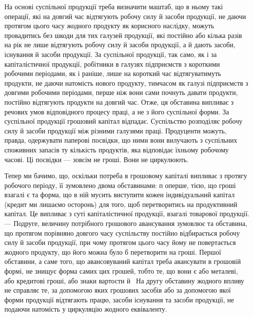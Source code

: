 
На основі суспільної продукції треба визначити маштаб, що в ньому
такі операції, які на довгий час відтягують робочу силу й засоби продукції,
не даючи протягом цього часу жодного продукту як корисного
наслідку, можуть провадитись без шкоди для тих галузей продукції, які
постійно або кілька разів на рік не лише відтягують робочу силу й засоби
продукції, а й дають засоби, існування й засоби продукції. За суспільної
продукції, так само, як і за капіталістичної продукції, робітники
в галузях підприємств з короткими робочими періодами, як і раніше, лише
на короткий час відтягуватимуть продукти, не даючи натомість нового
продукту, тимчасом як галузі підприємств з довгими робочими періодами,
перше ніж вони сами почнуть давати продукти, постійно відтягують
продукти на довгий час. Отже, ця обставина випливає з речових
умов відповідного процесу праці, а не з його суспільної форми. За суспільної
продукції грошовий капітал відпадає. Суспільство розподіляє робочу
силу й засоби продукції між різними галузями праці. Продуценти
можуть, правда, одержувати паперові посвідки, що ними вони вилучають
з суспільних споживних запасів ту кількість продуктів, яка відповідає їхньому
робочому часові. Ці посвідки — зовсім не гроші. Вони не циркулюють.

Тепер ми бачимо, що, оскільки потреба в грошовому капіталі випливає
з протягу робочого періоду, її зумовлено двома обставинами: п оперше,
тією, що гроші взагалі є та форма, що в ній мусить виступити
кожен індивідуальний капітал (кредит ми лишаємо осторонь) для того,
щоб перетворитись на продуктивний капітал. Це випливає з суті капіталістичної
продукції, взагалі товарової продукції. — Подруге, величину
потрібного грошового авансування зумовлює та обставина, що протягом
порівняно довгого часу суспільству постійно відбирається робочу силу
й засоби продукції, при чому протягом цього часу йому не повертається
жодного продукту, що його можна було б перетворити на гроші.
Першої обставини, а саме того, що авансовуваний капітал треба авансувати
в грошовій формі, не знищує форма самих цих грошей, тобто те,
що вони є або металеві, або кредитові гроші, або знаки вартости й~ На другу обставину жодного впливу не справляє те, за допомогою
яких грошових засобів або за допомогою якої форми продукції
відтягають працю, засоби існування та засоби продукції, не подаючи
натомість у циркуляцію жодного еквіваленту.
